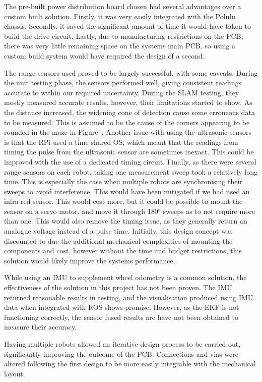 The pre-built power distribution board chosen had several advantages over a custom built solution. Firstly, it was very easily integrated with the Polulu chassis. Secondly, it saved the significant amount of time it would have taken to build the drive circuit. Lastly, due to manufacturing restrictions on the PCB, there was very little remaining space on the systems main PCB, so using a custom build system would have required the design of a second. 

The range sensors used proved to be largely successful, with some caveats. 
During the unit testing phase, the sensors performed well, giving consistent 
readings accurate to within our required uncertainty. During the SLAM testing, 
they mostly measured accurate results, however, their limitations started to 
show. As the distance increased, the widening cone of detection cause some 
erroneous data to be measured. This is assumed to be the cause of the corners 
appearing to be rounded in the maze in Figure~. 
Another issue with using the ultrasonic sensors is that the RPi used a time 
shared OS, which meant that the readings from timing the pulse from the 
ultrasonic sensor are sometimes inexact. This could be improved with the use of 
a dedicated timing circuit. Finally, as there were several range sensors on each 
robot, taking one measurement sweep took a relatively long time. This is 
especially the case when multiple robots are synchronising their sweeps to avoid 
interference. This would have been mitigated if we had used an infra-red sensor. 
This would cost more, but it could be possible to mount the sensor on a servo 
motor, and move it through \ang{180} sweeps as to not require more than one. 
This would also remove the timing issue, as they generally return an analogue 
voltage instead of a pulse time. Initially, this design concept was discounted 
to due the additional mechanical complexities of mounting the components and 
cost, however without the time and budget restrictions, this solution would 
likely improve the systems performance. 

While using an IMU to supplement wheel odometry is a common solution, the effectiveness of the solution in this project has not been proven. The IMU returned reasonable results in testing, and the visualisation produced using IMU data when integrated with ROS shows promise. However, as the EKF is not functioning correctly, the sensor fused results are have not been obtained to measure their accuracy. 

Having multiple robots allowed an 
iterative design process to be carried out, significantly improving the outcome 
of the PCB. Connections and vias were altered following the first design to be 
more easily integrable with the mechanical layout. 


